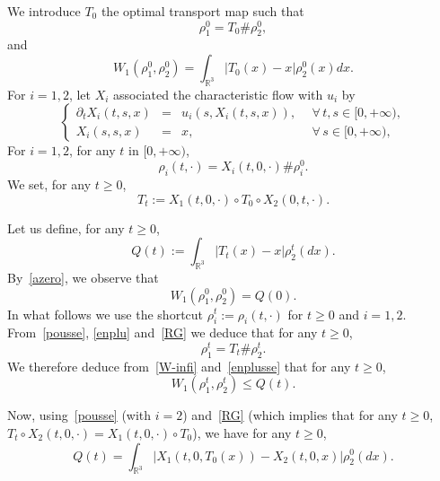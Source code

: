 \documentclass[10pt]{amsart}
\theoremstyle{definition}\newtheorem{defi}[theo]{Definition}\newtheorem{rema}[theo]{Remark}\newtheorem{exam}[theo]{Example}\newtheorem{exem}[theo]{Example}\newtheorem{nota}[theo]{Notation}
\newcommand{\R}{\mathbb{R}}
\renewcommand{\leq}{\leqslant}
\renewcommand{\geq}{\geqslant}
\let\oldforall\forall
\renewcommand*{\forall}{\mathrel{\oldforall}}
\begin{document}
We introduce $T_0$ the optimal transport map such that
\begin{equation}\label{enplu}
\rho_1^0=T_0\#\rho_2^0,
\end{equation}
and
\begin{equation}\label{azero}
W_1\left(\rho_1^0,\rho_2^0\right)=\int_{\R^3} |T_0(x)-x| \rho_2^0(x) dx.
\end{equation}
For $i=1,2$, let $X_i$ associated the characteristic flow with $u_i$ by
\begin{equation}\label{cflow}
\left \{
\begin{array}{rcll}
\partial_t X_i(t,s,x) & = & u_i(s, X_i(t,s,x)),&\: \: \forall \, t,s\in[0,+\infty), \\
X_i(s,s,x) & = & x,& \: \: \forall \, s \in [0,+\infty),
\end{array}
\right.
\end{equation}
For $i=1,2$, for any $t$ in $[0,+\infty)$,
\begin{equation}\label{pousse}
\rho_i (t,\cdot) =X_i (t,0,\cdot) \#\rho_i^0.
\end{equation}
We set, for any $t\geq 0$,
\begin{equation}\label{RG}
T_t :=X_1(t,0,\cdot) \circ T_0 \circ X_2(0,t,\cdot).
\end{equation}

Let us define, for any $t\geq 0$,
\begin{equation*}
Q(t) := \int_{\R^3} |T_t(x) -x| \rho_2^t(dx).
\end{equation*}
By~\eqref{azero}, we observe that
\begin{equation}\label{prem-zero}
W_1 \left(\rho_1^0,\rho_2^0\right) =Q(0).
\end{equation}
In what follows we use the shortcut $\rho_i^t:=\rho_i(t,\cdot)$ for $t\geq 0 $ and $i=1,2$. From~\eqref{pousse}, \eqref{enplu} and~\eqref{RG} we deduce that for any $t\geq 0$,
\begin{equation}\label{enplusse}
\rho_1^t=T_t \#\rho_2^t.
\end{equation}
We therefore deduce from~\eqref{W-infi} and~\eqref{enplusse} that for any $t\geq 0$,
\begin{equation}\label{prem}
W_1 (\rho_1^t,\rho_2^t) \leq Q(t).
\end{equation}

Now, using~\eqref{pousse} (with $i=2$) and~\eqref{RG} (which implies that for any $t\geq 0$, $T_t \circ X_2(t,0,\cdot)=X_1(t,0,\cdot) \circ T_0 $), we have for any $t\geq 0$,
\begin{equation}\label{reexpQ}
Q(t) = \int_{\R^3} \left| X_1\left(t,0,T_0 (x)\right) -X_2(t,0,x)\right| \rho_2^0(dx).
\end{equation}
\end{document}

